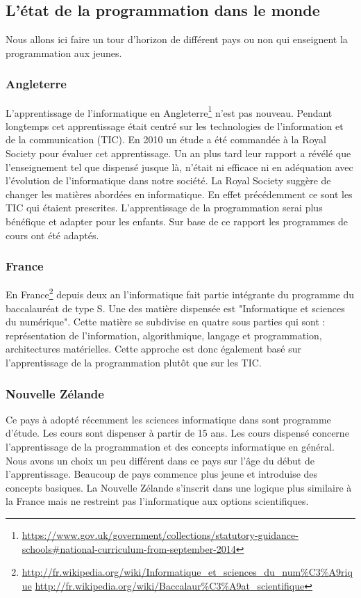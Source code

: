 \subsection{L'état de la programmation dans le monde}
Nous allons ici faire un tour d'horizon de différent pays ou non qui enseignent la programmation aux jeunes. 
\subsubsection{Angleterre}

L'apprentissage de l'informatique en Angleterre\footnote{\url{https://www.gov.uk/government/collections/statutory-guidance-schools\#national-curriculum-from-september-2014}} n'est pas nouveau. Pendant longtemps cet apprentissage était centré sur les technologies de l'information et de la communication (TIC). En 2010 un étude a été commandée à la Royal Society pour évaluer cet apprentissage. Un an plus tard leur rapport a révélé que l'enseignement tel que dispensé jusque là, n'était ni efficace ni en adéquation avec l'évolution de l'informatique dans notre société. La Royal Society suggère de changer les matières abordées en informatique. En effet précédemment ce sont les TIC qui étaient prescrites. L'apprentissage de la programmation serai plus bénéfique et adapter pour les enfants. Sur base de ce rapport les programmes de cours ont été adaptés.


\subsubsection{France}
En France\footnote{\url{http://fr.wikipedia.org/wiki/Informatique\_et\_sciences\_du\_num\%C3\%A9rique}
\url{http://fr.wikipedia.org/wiki/Baccalaur\%C3\%A9at\_scientifique}} depuis deux an l'informatique fait partie intégrante du programme du baccalauréat de type S. Une des matière dispensée est "Informatique et sciences du numérique". Cette matière se subdivise en quatre sous parties qui sont : représentation de l'information, algorithmique, langage et programmation, architectures matérielles. Cette approche est donc également basé sur l'apprentissage de la programmation plutôt que sur les TIC.

\subsubsection{Nouvelle Zélande}
Ce pays à adopté récemment les sciences informatique dans sont programme d'étude. Les cours sont dispenser à partir de 15 ans. Les cours dispensé concerne l'apprentissage de la programmation et des concepts informatique en général. Nous avons un choix un peu différent dans ce pays sur l'âge du début de l'apprentissage. Beaucoup de pays commence plus jeune et introduise des concepts basiques. La Nouvelle Zélande s'inscrit dans une logique plus similaire à la France mais ne restreint pas l'informatique aux options scientifiques.


